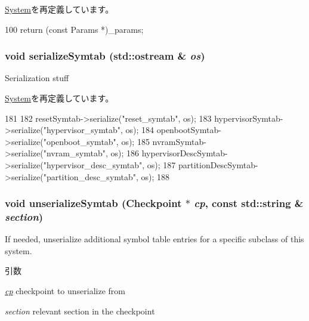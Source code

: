\hyperlink{classSystem_acd3c3feb78ae7a8f88fe0f110a718dff}{System}を再定義しています。


\begin{DoxyCode}
100 { return (const Params *)_params; }
\end{DoxyCode}
\hypertarget{classSparcSystem_a4a3f2000b7188750d8fc90aa204fbfd9}{
\subsubsection[{serializeSymtab}]{\setlength{\rightskip}{0pt plus 5cm}void serializeSymtab (std::ostream \& {\em os})}}
\label{classSparcSystem_a4a3f2000b7188750d8fc90aa204fbfd9}
Serialization stuff 

\hyperlink{classSystem_a4a6e514fbf1ef35f9a914680884cedef}{System}を再定義しています。


\begin{DoxyCode}
181 {
182     resetSymtab->serialize("reset_symtab", os);
183     hypervisorSymtab->serialize("hypervisor_symtab", os);
184     openbootSymtab->serialize("openboot_symtab", os);
185     nvramSymtab->serialize("nvram_symtab", os);
186     hypervisorDescSymtab->serialize("hypervisor_desc_symtab", os);
187     partitionDescSymtab->serialize("partition_desc_symtab", os);
188 }
\end{DoxyCode}
\hypertarget{classSparcSystem_a183b92b9eac0994f5d446702e995132a}{
\subsubsection[{unserializeSymtab}]{\setlength{\rightskip}{0pt plus 5cm}void unserializeSymtab ({\bf Checkpoint} $\ast$ {\em cp}, \/  const std::string \& {\em section})}}
\label{classSparcSystem_a183b92b9eac0994f5d446702e995132a}
If needed, unserialize additional symbol table entries for a specific subclass of this system.


\begin{DoxyParams}{引数}
\item[{\em \hyperlink{namespacecp}{cp}}]checkpoint to unserialize from \item[{\em section}]relevant section in the checkpoint \end{DoxyParams}


